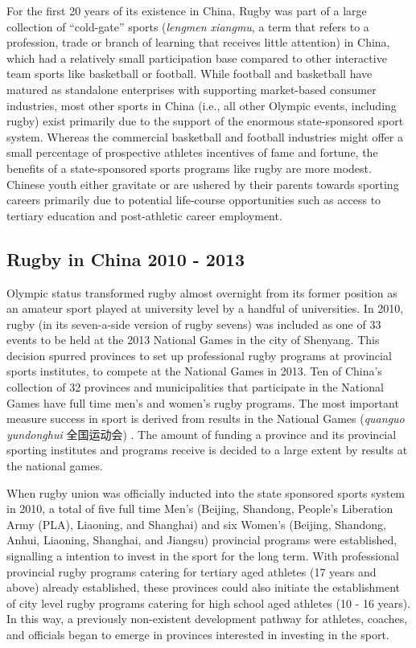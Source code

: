 \begin{CJK}{UTF8}{gbsn}
For the first 20 years of its existence in China, Rugby was part of a large collection of ``cold-gate'' sports (\textit{lengmen xiangmu}, a term that refers to a profession, trade or branch of learning that receives little attention) in China, which had a relatively small participation base compared to other interactive team sports like basketball or football.  While football and basketball have matured as standalone enterprises with supporting market-based consumer industries, most other sports in China (i.e., all other Olympic events, including rugby) exist primarily due to the support of the enormous state-sponsored sport system.  Whereas the commercial basketball and football industries might offer a small percentage of prospective athletes incentives of fame and fortune, the benefits of a state-sponsored sports programs like rugby are more modest.  Chinese youth either gravitate or are ushered by their parents towards sporting careers primarily due to potential life-course opportunities such as access to tertiary education and post-athletic career employment.


\subsection{Rugby in China 2010 - 2013 \label{sect:rugbyinChina}}
Olympic status transformed rugby almost overnight from its former position as an amateur sport played at university level by a handful of universities.  In 2010, rugby (in its seven-a-side version of rugby sevens) was included as one of 33 events to be held at the 2013 National Games in the city of Shenyang. This decision spurred provinces to set up professional rugby programs at provincial sports institutes, to compete at the National Games in 2013.  Ten of China's collection of 32 provinces and municipalities that participate in the National Games have full time men's and women's rugby programs.  The most important measure success in sport is derived from results in the National Games (\textit{quanguo yundonghui} 全国运动会) \citep{Hong2002}.  The amount of funding a province and its provincial sporting institutes and programs receive is decided to a large extent by results at the national games.

When rugby union was officially inducted into the state sponsored sports system in 2010, a total of five full time Men's (Beijing, Shandong, People's Liberation Army (PLA), Liaoning, and Shanghai) and six Women's (Beijing, Shandong, Anhui, Liaoning, Shanghai, and Jiangsu) provincial programs were established, signalling a intention to invest in the sport for the long term.  With professional provincial rugby programs catering for tertiary aged athletes (17 years and above) already established, these provinces could also initiate the establishment of city level rugby programs catering for high school aged athletes (10 - 16 years).  In this way, a previously non-existent development pathway for athletes, coaches, and officials began to emerge in provinces interested in investing in the sport.


\end{CJK}
